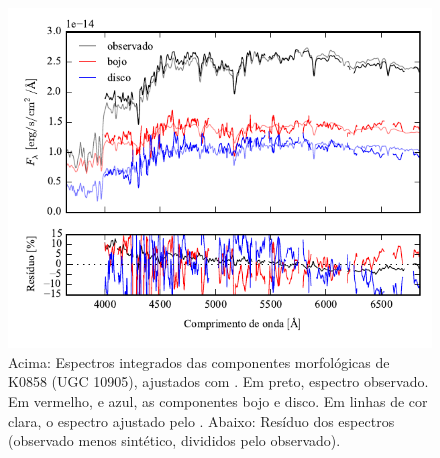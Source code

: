 \begin{figure}
	\includegraphics[page=15]{figuras/sample006a_synthesis}
	\caption[Espectros ajustados com \starlight das componentes morfológicas de
	K0858 (UGC 10905)]
	{Acima: Espectros integrados das componentes morfológicas de
	K0858 (UGC 10905), ajustados com \starlight. Em preto, espectro observado. Em
	vermelho, e azul, as componentes bojo e disco. Em linhas de cor clara, o
	espectro ajustado pelo \starlight. Abaixo: Resíduo dos espectros (observado
	menos sintético, divididos pelo observado).}
	\label{fig:decompSintese:K0858}
\end{figure}

